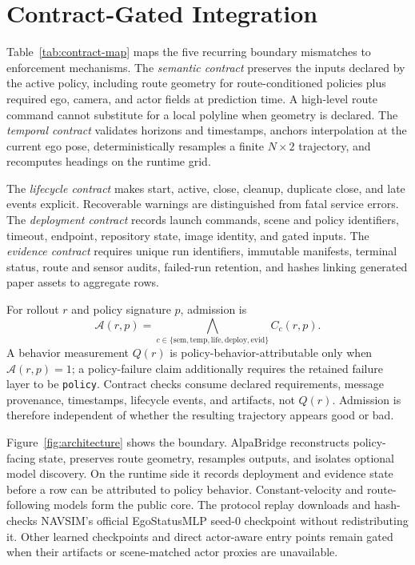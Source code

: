\documentclass[a4paper,10pt,conference]{ieeeconf}
\begin{document}
\section{Contract-Gated Integration}

Table~\ref{tab:contract-map} maps the five recurring boundary mismatches to enforcement
mechanisms. The \emph{semantic contract} preserves the inputs declared by the active
policy, including route geometry for route-conditioned policies plus required ego,
camera, and actor fields at prediction time. A high-level route command cannot
substitute for a local polyline when geometry is declared. The \emph{temporal
contract} validates horizons and timestamps, anchors interpolation at the current ego
pose, deterministically resamples a finite $N\times2$ trajectory, and recomputes
headings on the runtime grid.

\begin{table}[t]
\centering
\caption{Contracts enforced at the policy/simulator boundary.}
\label{tab:contract-map}
\resizebox{\columnwidth}{!}{}
\end{table}

The \emph{lifecycle contract} makes start, active, close, cleanup, duplicate close, and
late events explicit. Recoverable warnings are distinguished from fatal service errors.
The \emph{deployment contract} records launch commands, scene and policy identifiers,
timeout, endpoint, repository state, image identity, and gated inputs. The
\emph{evidence contract} requires unique run identifiers, immutable manifests, terminal
status, route and sensor audits, failed-run retention, and hashes linking generated
paper assets to aggregate rows.

For rollout $r$ and policy signature $p$, admission is
\begin{equation}
\mathcal{A}(r,p)=\bigwedge_{c\in\{\mathrm{sem,temp,life,deploy,evid}\}}
C_c(r,p).
\end{equation}
A behavior measurement $Q(r)$ is policy-behavior-attributable only when
$\mathcal{A}(r,p)=1$; a policy-failure claim additionally requires the retained failure
layer to be \texttt{policy}. Contract checks consume declared requirements, message
provenance, timestamps, lifecycle events, and artifacts, not $Q(r)$. Admission is
therefore independent of whether the resulting trajectory appears good or bad.

Figure~\ref{fig:architecture} shows the boundary. AlpaBridge reconstructs policy-facing
state, preserves route geometry, resamples outputs, and isolates optional model
discovery. On the runtime side it records deployment and evidence state before a row can
be attributed to policy behavior. Constant-velocity and route-following models form the
public core. The protocol replay downloads and hash-checks NAVSIM's official
EgoStatusMLP seed-0 checkpoint without redistributing it. Other learned checkpoints and
direct actor-aware entry points remain gated when their artifacts or scene-matched actor
proxies are unavailable.
\end{document}
